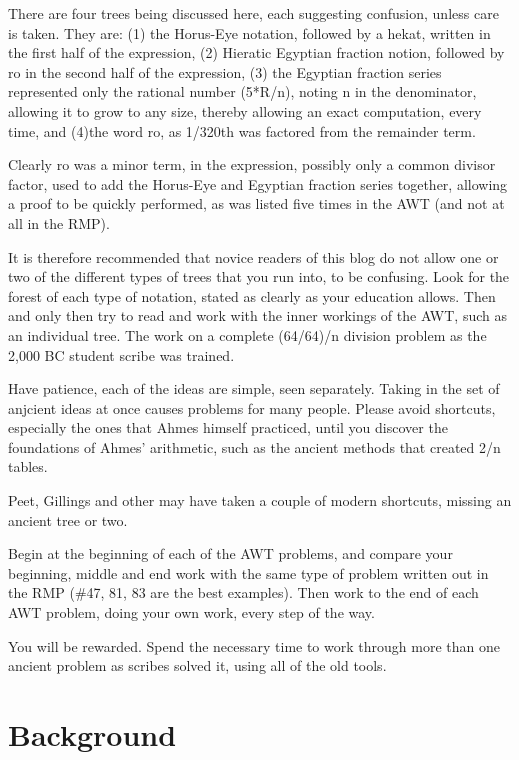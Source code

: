 \documentclass[12pt]{article}
\begin{document}
There are four trees being discussed here, each suggesting confusion, unless care is taken. They are: (1) the Horus-Eye notation, followed by a hekat, written in the first half of the expression, (2) Hieratic Egyptian fraction notion, followed by ro in the second half of the expression, (3) the Egyptian fraction series represented only the rational number (5*R/n), noting n in the denominator, allowing it to grow to any size, thereby allowing an exact computation, every time, and (4)the word ro,
as 1/320th was factored from the remainder term.

Clearly ro was a minor term, in the expression, possibly only a common divisor factor, used to add the Horus-Eye and Egyptian fraction series together, allowing a proof to be quickly performed, as was listed five times in the AWT (and not at all in the RMP).

It is therefore recommended that novice readers of this blog do not allow one or two of the different types of trees that you run into, to be confusing. Look for the forest of each type of notation, stated as clearly as your education allows. Then and only then try to read and work with the inner workings of the AWT, such as an individual tree. The work on a complete (64/64)/n division problem as the 2,000 BC student scribe was trained.

Have patience, each of the ideas are simple, seen separately. Taking in the set of anjcient ideas at once causes problems for many people. Please avoid shortcuts, especially the ones that Ahmes himself practiced, until you discover the foundations of Ahmes' arithmetic, such as the ancient methods that created 2/n tables.

Peet, Gillings and other may have taken a couple of modern shortcuts, missing an ancient tree or two.

Begin at the beginning of each of the AWT problems, and compare your beginning, middle and end work with the same type of problem written out in the RMP (\#47, 81, 83 are the best examples). Then work to the end of each AWT problem, doing your own work, every step of the way.

You will be rewarded. Spend the necessary time to work through more than one ancient problem as scribes solved it, using all of the old tools.

\section{Background}
\end{document}
